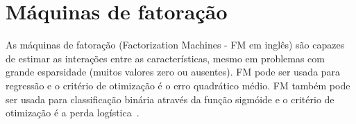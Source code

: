 \section{Máquinas de fatoração}
\label{sec:fun:fm}

As máquinas de fatoração (Factorization Machines - FM em inglês) são capazes de estimar as interações entre as características, mesmo em problemas com grande esparsidade (muitos valores zero ou ausentes).
FM pode ser usada para regressão e o critério de otimização é o erro quadrático médio.
FM também pode ser usada para classificação binária através da função sigmóide e o critério de otimização é a perda logística~\cite{facmachineo,apachesparkml}.

